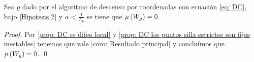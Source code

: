 \begin{corollary}
	\label{coro: DC converge a minimos}
	Sea $g$ dado por el algoritmo de descenso por coordenadas con ecuaci\'on \ref{eq: DC}, bajo \ref{Hipotesis 2} y $\alpha < \frac{1}{L_b}$ se tiene que $\mu\left(W_g\right) = 0$.
\end{corollary}

\begin{proof}
	Por \ref{prop: DC es difeo local} y \ref{prop: DC los puntos silla estrictos son fijos inestables} tenemos que vale \ref{coro: Resultado principal} y conclu\'imos que $\mu \left(W_g\right) = 0$. \qed
\end{proof}
